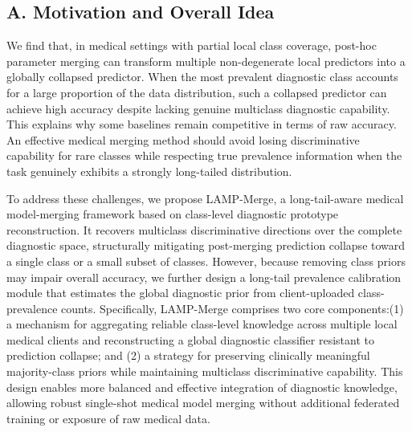 \documentclass[letterpaper]{article} %
\begin{document}
\subsection{A. Motivation and Overall Idea}

We find that, in medical settings with partial local class coverage, post-hoc parameter merging can transform multiple non-degenerate local predictors into a globally collapsed predictor. When the most prevalent diagnostic class accounts for a large proportion of the data distribution, such a collapsed predictor can achieve high accuracy despite lacking genuine multiclass diagnostic capability. This explains why some baselines remain competitive in terms of raw accuracy. An effective medical merging method should avoid losing discriminative capability for rare classes while respecting true prevalence information when the task genuinely exhibits a strongly long-tailed distribution.

To address these challenges, we propose LAMP-Merge, a long-tail-aware medical model-merging framework based on class-level diagnostic prototype reconstruction. It recovers multiclass discriminative directions over the complete diagnostic space, structurally mitigating post-merging prediction collapse toward a single class or a small subset of classes. However, because removing class priors may impair overall accuracy, we further design a long-tail prevalence calibration module that estimates the global diagnostic prior from client-uploaded class-prevalence counts. Specifically, LAMP-Merge comprises two core components:(1) a mechanism for aggregating reliable class-level knowledge across multiple local medical clients and reconstructing a global diagnostic classifier resistant to prediction collapse; and (2) a strategy for preserving clinically meaningful majority-class priors while maintaining multiclass discriminative capability. This design enables more balanced and effective integration of diagnostic knowledge, allowing robust single-shot medical model merging without additional federated training or exposure of raw medical data.
\end{document}
